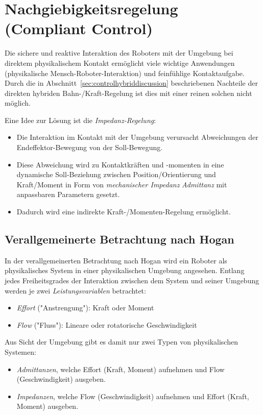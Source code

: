 	\section{Nachgiebigkeitsregelung (Compliant Control)}
		Die sichere und reaktive Interaktion des Roboters mit der Umgebung bei direktem physikalischem Kontakt ermöglicht viele wichtige Anwendungen (\zB physikalische Mensch-Roboter-Interaktion) und feinfühlige Kontaktaufgabe. Durch die in Abschnitt~\ref{sec:controlhybriddiscussion} beschriebenen Nachteile der direkten hybriden Bahn-/Kraft-Regelung ist dies mit einer reinen solchen nicht möglich.
		
		Eine Idee zur Lösung ist die \emph{Impedanz-Regelung}:
		\begin{itemize}
			\item Die Interaktion im Kontakt mit der Umgebung verursacht Abweichungen der Endeffektor-Bewegung von der Soll-Bewegung.
			\item Diese Abweichung wird zu Kontaktkräften und -momenten in eine dynamische Soll-Beziehung zwischen Position/Orientierung und Kraft/Moment in Form von \emph{mechanischer Impedanz} \bzw \emph{Admittanz} mit anpassbaren Parametern gesetzt.
			\item Dadurch wird eine indirekte Kraft-/Momenten-Regelung ermöglicht.
		\end{itemize}

		\subsection{Verallgemeinerte Betrachtung nach Hogan}
			In der verallgemeinerten Betrachtung nach Hogan wird ein Roboter als physikalisches System in einer physikalischen Umgebung angesehen. Entlang jedes Freiheitsgrades der Interaktion zwischen dem System und seiner Umgebung werden je zwei \emph{Leistungsvariablen} betrachtet:
			\begin{itemize}
				\item \emph{Effort} ("Anstrengung"): Kraft oder Moment
				\item \emph{Flow} ("Fluss"): Lineare oder rotatorische Geschwindigkeit
			\end{itemize}
			Aus Sicht der Umgebung gibt es damit nur zwei Typen von physikalischen Systemen:
			\begin{itemize}
				\item \emph{Admittanzen}, welche Effort (Kraft, Moment) aufnehmen und Flow (Geschwindigkeit) ausgeben.
				\item \emph{Impedanzen}, welche Flow (Geschwindigkeit) aufnehmen und Effort (Kraft, Moment) ausgeben.
			\end{itemize}
		
